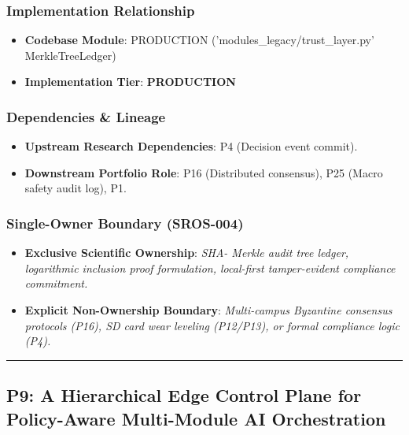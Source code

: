 \documentclass[11pt,letterpaper]{article}
\begin{document}
\subsubsection{Implementation Relationship}
\begin{itemize}[leftmargin=*]
    \item \raggedright \textbf{Codebase Module}: PRODUCTION ('modules\_\allowbreak legacy/\allowbreak trust\_\allowbreak layer.py' MerkleTreeLedger)
    \item \textbf{Implementation Tier}: \textbf{PRODUCTION}
\end{itemize}

\subsubsection{Dependencies \& Lineage}
\begin{itemize}[leftmargin=*]
    \item \textbf{Upstream Research Dependencies}: P4 (Decision event commit).
    \item \textbf{Downstream Portfolio Role}: P16 (Distributed consensus), P25 (Macro safety audit log), P1.
\end{itemize}

\subsubsection{Single-Owner Boundary (SROS-004)}
\begin{itemize}[leftmargin=*]
    \item \textbf{Exclusive Scientific Ownership}: \textit{SHA- Merkle audit tree ledger, logarithmic inclusion proof formulation, local-\allowbreak first tamper-\allowbreak evident compliance commitment.}
    \item \textbf{Explicit Non-Ownership Boundary}: \textit{Multi-\allowbreak campus Byzantine consensus protocols (P16), SD card wear leveling (P12/\allowbreak P13), or formal compliance logic (P4).}
\end{itemize}

\vspace{0.4cm}
\hrule

\subsection{P9: A Hierarchical Edge Control Plane for Policy-\allowbreak Aware Multi-\allowbreak Module AI Orchestration}
\label{sec:profile_p9}
\end{document}
